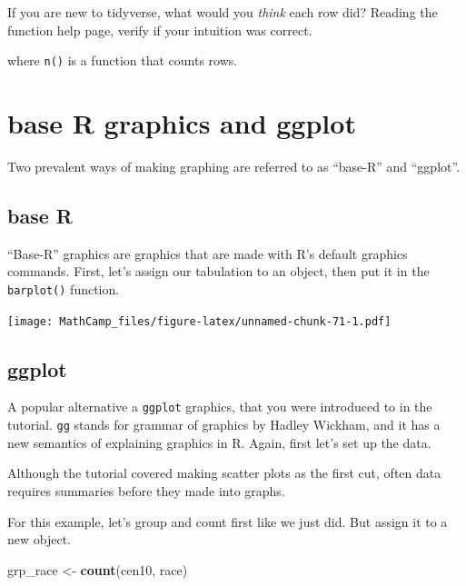 \documentclass[
]{book}
\newenvironment{Shaded}{\begin{snugshade}}{\end{snugshade}}
\newcommand{\KeywordTok}[1]{\textcolor[rgb]{0.13,0.29,0.53}{\textbf{#1}}}
\newcommand{\NormalTok}[1]{#1}
\newcommand{\OperatorTok}[1]{\textcolor[rgb]{0.81,0.36,0.00}{\textbf{#1}}}
\newcommand{\StringTok}[1]{\textcolor[rgb]{0.31,0.60,0.02}{#1}}
\theoremstyle{definition}
\theoremstyle{definition}
\theoremstyle{definition}
\theoremstyle{definition}
\theoremstyle{remark}
\begin{document}
If you are new to tidyverse, what would you \emph{think} each row did? Reading the function help page, verify if your intuition was correct.

where \texttt{n()} is a function that counts rows.

\hypertarget{base-r-graphics-and-ggplot}{%
\section{base R graphics and ggplot}\label{base-r-graphics-and-ggplot}}

Two prevalent ways of making graphing are referred to as ``base-R'' and ``ggplot''.

\hypertarget{base-r}{%
\subsection{base R}\label{base-r}}

``Base-R'' graphics are graphics that are made with R's default graphics commands. First, let's assign our tabulation to an object,
then put it in the \texttt{barplot()} function.

\begin{Shaded}
\end{Shaded}

\texttt{[image: MathCamp\_files/figure-latex/unnamed-chunk-71-1.pdf]}

\hypertarget{ggplot}{%
\subsection{ggplot}\label{ggplot}}

A popular alternative a \texttt{ggplot} graphics, that you were introduced to in the tutorial. \texttt{gg} stands for grammar of graphics by Hadley Wickham, and it has a new semantics of explaining graphics in R. Again, first let's set up the data.

Although the tutorial covered making scatter plots as the first cut, often data requires summaries before they made into graphs.

For this example, let's group and count first like we just did. But assign it to a new object.

\begin{Shaded}
\begin{Highlighting}[]
\NormalTok{grp_race <-}\StringTok{ }\KeywordTok{count}\NormalTok{(cen10, race)}
\end{Highlighting}
\end{Shaded}
\end{document}
